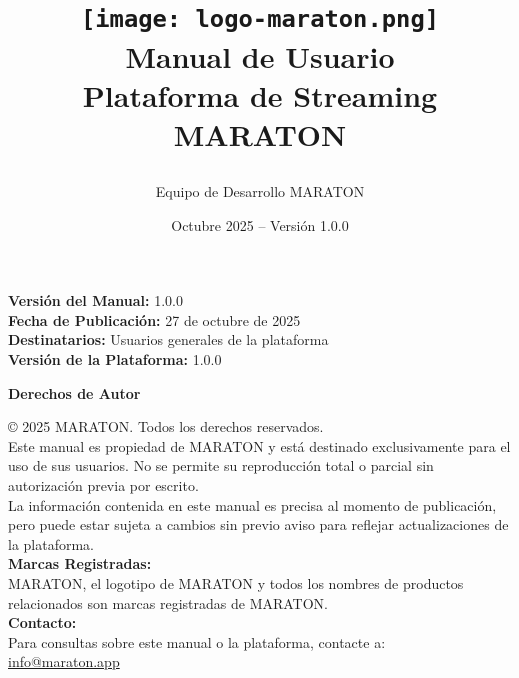 \documentclass[11pt,a4paper,twoside]{book}
\title{
    \vspace{-2cm}
    \begin{center}
    \texttt{[image: logo-maraton.png]}\\[2cm]
    {\Huge\bfseries Manual de Usuario}\\[0.5cm]
    {\Large Plataforma de Streaming MARATON}\\[1cm]
    \end{center}
}
\author{Equipo de Desarrollo MARATON}
\date{Octubre 2025 -- Versión 1.0.0}
\begin{document}
\maketitle
\thispagestyle{empty}

\vfill
\begin{center}
\begin{tcolorbox}[width=0.8\textwidth,colback=maratonlight,colframe=maratonblue,arc=5pt]
\centering
\textbf{Versión del Manual:} 1.0.0\\
\textbf{Fecha de Publicación:} 27 de octubre de 2025\\
\textbf{Destinatarios:} Usuarios generales de la plataforma\\
\textbf{Versión de la Plataforma:} 1.0.0
\end{tcolorbox}
\end{center}

\newpage

\thispagestyle{empty}
\vspace*{\fill}
\begin{center}
\textbf{\Large Derechos de Autor}\\[1cm]
\end{center}

\noindent
© 2025 MARATON. Todos los derechos reservados.\\[0.5cm]

\noindent
Este manual es propiedad de MARATON y está destinado exclusivamente para el uso de sus usuarios. No se permite su reproducción total o parcial sin autorización previa por escrito.\\[0.5cm]

\noindent
La información contenida en este manual es precisa al momento de publicación, pero puede estar sujeta a cambios sin previo aviso para reflejar actualizaciones de la plataforma.\\[0.5cm]

\noindent
\textbf{Marcas Registradas:}\\
MARATON, el logotipo de MARATON y todos los nombres de productos relacionados son marcas registradas de MARATON.\\[0.5cm]

\noindent
\textbf{Contacto:}\\
Para consultas sobre este manual o la plataforma, contacte a:\\
\href{mailto:info@maraton.app}{info@maraton.app}
\end{document}
